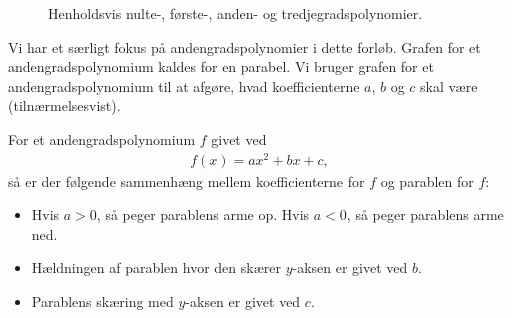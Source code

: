 \begin{figure}[H]
\centering
\resizebox{0.45\textwidth}{!}
{
}
\resizebox{0.45\textwidth}{!}
{
}
\resizebox{0.45\textwidth}{!}
{
}
\resizebox{0.45\textwidth}{!}
{
}
\caption{Henholdsvis nulte-, første-, anden- og tredjegradspolynomier.}
\label{fig:polys}
\end{figure}

Vi har et særligt fokus på andengradspolynomier i dette forløb. Grafen for et andengradspolynomium kaldes for en parabel. Vi bruger grafen for et andengradspolynomium til at afgøre, hvad koefficienterne $a$, $b$ og $c$ skal være (tilnærmelsesvist).
\begin{setn}
For et andengradspolynomium $f$ givet ved
\begin{align*}
f(x) = ax^2+bx+c,
\end{align*}
så er der følgende sammenhæng mellem koefficienterne for $f$ og parablen for $f$:
\begin{itemize}
\item Hvis $a>0$, så peger parablens arme op. Hvis $a<0$, så peger parablens arme ned.
\item Hældningen af parablen hvor den skærer $y$-aksen er givet ved $b$.
\item Parablens skæring med $y$-aksen er givet ved $c$.
\end{itemize}
\end{setn}

